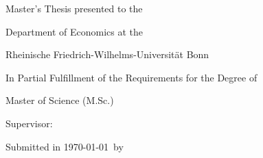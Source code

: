 \begin{titlepage}
	\begin{center}\large\mbox{}

		\thispagestyle{empty}

		\vfill

		{\Large{\textbf{\thesistitle}}}

		\vspace{1.5\baselineskip}

		Master's Thesis presented to the

		Department of Economics at the

		Rheinische Friedrich-Wilhelms-Universit{\"a}t Bonn

		\vspace{1.5\baselineskip}

		In Partial Fulfillment of the Requirements for the Degree of

		Master of Science (M.Sc.)

		\vspace{8\baselineskip}

		Supervisor: \advisorname

		\vfill

		Submitted in \monthyeardate\today\ by \thesisauthor \\

		\vfill
	\end{center}
\end{titlepage}